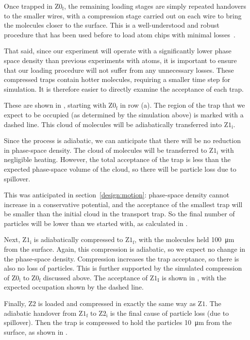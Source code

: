 Once trapped in $\mathrm{Z0_f}$, the remaining loading stages are simply
repeated handovers to the smaller wires, with a compression stage carried out
on each wire to bring the molecules closer to the surface. This is a
well-understood and robust procedure that has been used before to load atom
chips with minimal losses~\cite{Reichel2002}.

That said, since our experiment will operate with a significantly lower phase
space density than previous experiments with atoms, it is important to ensure
that our loading procedure will not suffer from any unnecessary losses. These
compressed traps contain hotter molecules, requiring a smaller time step for
simulation. It is therefore easier to directly examine the acceptance of each
trap.

These are shown in , starting with
$\mathrm{Z0_f}$ in row (a). The region of the trap that we expect to be
occupied (as determined by the simulation above) is marked with a dashed line.
This cloud of molecules will be adiabatically transferred into $\mathrm{Z1_i}$.

Since the process is adiabatic, we can anticipate that there will be no
reduction in phase-space density. The cloud of molecules will be transferred to
$\mathrm{Z1_i}$ with negligible heating. However, the total acceptance of the
trap is less than the expected phase-space volume of the cloud, so there
will be particle loss due to spillover.

This was anticipated in section~\ref{design:motion}: phase-space density cannot
increase in a conservative potential, and the acceptance of the smallest trap
will be smaller than the initial cloud in the transport trap. So the final
number of particles will be lower than we started with, as calculated in
.

Next, $\mathrm{Z1_i}$ is adiabatically compressed to $\mathrm{Z1_f}$, with the
molecules held \SI{100}{\micro\meter} from the surface. Again, this
compression is adiabatic, so we expect no change in the phase-space density.
Compression increases the trap acceptance, so there is also no loss of
particles. This is further supported by the simulated compression of
$\mathrm{Z0_i}$ to $\mathrm{Z0_f}$ discussed above. The acceptance of
$\mathrm{Z1_I}$ is shown in , with
the expected occupation shown by the dashed line.

Finally, $\mathrm{Z2}$ is loaded and compressed in exactly the same way as
$\mathrm{Z1}$. The adiabatic handover from $\mathrm{Z1_f}$ to $\mathrm{Z2_i}$
is the final cause of particle loss (due to spillover). Then the trap is
compressed to hold the particles \SI{10}{\micro\meter} from the surface, as
shown in .


